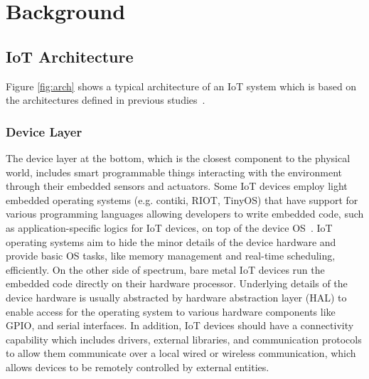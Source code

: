 
\chapter{Background}
\label{ch:background}

\section{IoT Architecture}
Figure \autoref{fig:arch} shows a typical architecture of an IoT system which is based on the architectures defined in previous studies~\citep{towardsIoTDefinition,stojkoska2017review,vcolakovic2018IoT,eclipse2016three}. 

\subsection{Device Layer}
The device layer at the bottom, which is the closest component to the physical world, includes smart programmable things interacting with the environment through their embedded sensors and actuators. Some IoT devices employ light embedded operating systems (e.g. contiki, RIOT, TinyOS) that have support for various programming languages allowing developers to write embedded code, such as application-specific logics for IoT devices, on top of the device OS~\cite{javed2018OS}. IoT operating systems aim to hide the minor details of the device hardware and provide basic OS tasks, like memory management and real-time scheduling, efficiently\cite{javed2018OS}. On the other side of spectrum, bare metal IoT devices run the embedded code directly on their hardware processor. Underlying details of the device hardware is usually abstracted by hardware abstraction layer (HAL) to enable access for the operating system to various hardware components like GPIO, and serial interfaces\cite{eclipse2016three}. In addition, IoT devices should have a connectivity capability which includes drivers, external libraries, and communication protocols to allow them communicate over a local wired or wireless communication, which allows devices to be remotely controlled by external entities.


